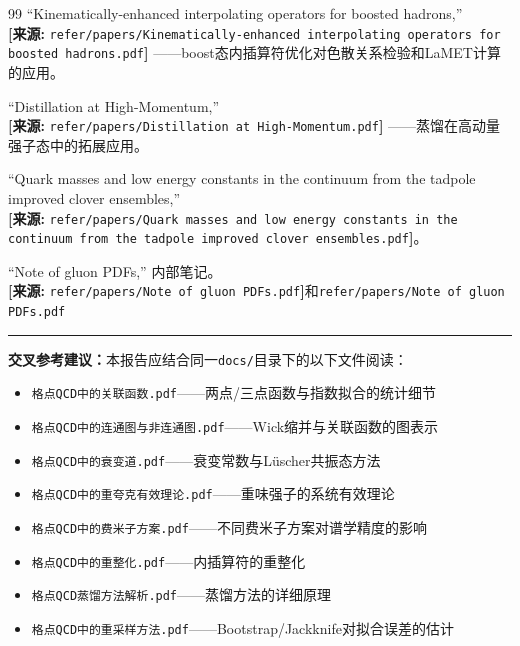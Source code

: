 \documentclass[12pt,a4paper]{ctexart}
\theoremstyle{definition}
\begin{document}
\begin{thebibliography}{99}
``Kinematically-enhanced interpolating operators for boosted hadrons,''
\\\textbf{[来源:} \texttt{refer/papers/Kinematically-enhanced interpolating operators for boosted hadrons.pdf}\textbf{]}
——boost态内插算符优化对色散关系检验和LaMET计算的应用。

``Distillation at High-Momentum,''
\\\textbf{[来源:} \texttt{refer/papers/Distillation at High-Momentum.pdf}\textbf{]}
——蒸馏在高动量强子态中的拓展应用。

``Quark masses and low energy constants in the continuum from the tadpole improved clover ensembles,''
\\\textbf{[来源:} \texttt{refer/papers/Quark masses and low energy constants in the continuum from the tadpole improved clover ensembles.pdf}\textbf{]}。

``Note of gluon PDFs,'' 内部笔记。
\\\textbf{[来源:} \texttt{refer/papers/Note of gluon PDFs.pdf}\textbf{]}和\texttt{refer/papers/Note of gluon PDFs.pdf}

\end{thebibliography}

\vspace{0.5cm}
\noindent\rule{\textwidth}{0.5pt}
\small
\textbf{交叉参考建议：}本报告应结合同一\texttt{docs/}目录下的以下文件阅读：
\begin{itemize}[nosep]
    \item \texttt{格点QCD中的关联函数.pdf}——两点/三点函数与指数拟合的统计细节
    \item \texttt{格点QCD中的连通图与非连通图.pdf}——Wick缩并与关联函数的图表示
    \item \texttt{格点QCD中的衰变道.pdf}——衰变常数与L\"uscher共振态方法
    \item \texttt{格点QCD中的重夸克有效理论.pdf}——重味强子的系统有效理论
    \item \texttt{格点QCD中的费米子方案.pdf}——不同费米子方案对谱学精度的影响
    \item \texttt{格点QCD中的重整化.pdf}——内插算符的重整化
    \item \texttt{格点QCD蒸馏方法解析.pdf}——蒸馏方法的详细原理
    \item \texttt{格点QCD中的重采样方法.pdf}——Bootstrap/Jackknife对拟合误差的估计
\end{itemize}
\end{document}
